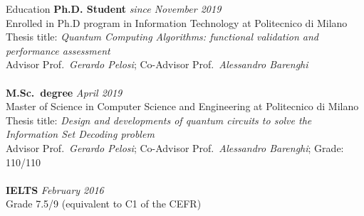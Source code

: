 \documentclass{resume} %
\begin{document}
\begin{mytabular}
\end{mytabular}

\begin{rSection}{Education}
\textbf{Ph.D. Student} \hfill \textit{since November 2019}
\\ Enrolled in Ph.D program in Information Technology at Politecnico di Milano 
\\ Thesis title: \textit{Quantum Computing Algorithms: functional validation and performance assessment}
\\ Advisor Prof.\ \textit{Gerardo Pelosi}; Co-Advisor Prof.\ \textit{Alessandro Barenghi}
\\
\\
\textbf{M.Sc.\ degree} \hfill \textit{April 2019} 
\\ Master of Science in Computer Science and Engineering at Politecnico di Milano
\\ Thesis title: \textit{Design and developments of quantum circuits to solve the Information Set Decoding problem}
\\ Advisor Prof.\ \textit{Gerardo Pelosi}; Co-Advisor Prof.\ \textit{Alessandro Barenghi}; Grade: 110/110
\\
\\
\textbf{IELTS} \hfill \textit{February 2016}
\\ Grade 7.5/9 (equivalent to C1 of the CEFR)
\\
\end{rSection}
\end{document}
